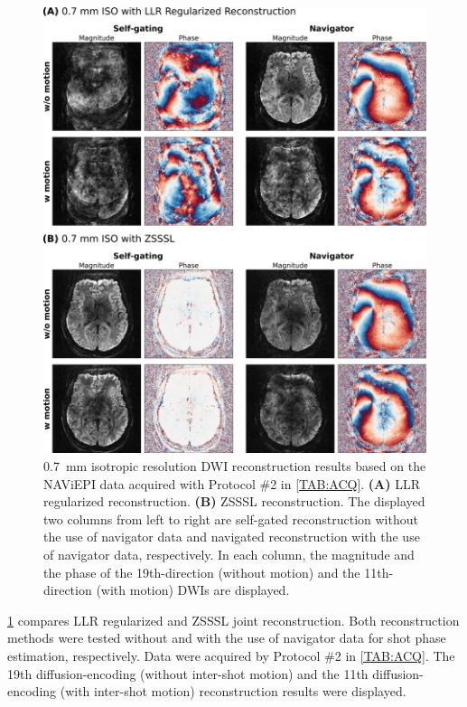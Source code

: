 \documentclass[journal,twoside,web]{ieeecolor}
\begin{document}
	\begin{figure}
		\centering
		\includegraphics[width=\textwidth]{../figures/fig3.png}
		\caption{\SI{0.7}{\milli\meter} isotropic resolution DWI reconstruction results
			based on the NAViEPI data acquired with Protocol \#2 in \cref{TAB:ACQ}.
			\textbf{(A)} LLR regularized reconstruction.
			\textbf{(B)} ZSSSL reconstruction.
			The displayed two columns from left to right are
			self-gated reconstruction without the use of navigator data and
			navigated reconstruction with the use of navigator data, respectively.
			In each column, the magnitude and the phase
			of the 19th-direction (without motion) and the 11th-direction (with motion)
			DWIs are displayed.
		}
		\label{FIG:MOTION_RETRO_AXIAL}
	\end{figure}

	\cref{FIG:MOTION_RETRO_AXIAL} compares LLR regularized
	and ZSSSL joint reconstruction.
	Both reconstruction methods were tested
	without and with the use of navigator data
	for shot phase estimation, respectively.
	Data were acquired by Protocol \#2 in \cref{TAB:ACQ}.
	The 19th diffusion-encoding (without inter-shot motion)
	and the 11th diffusion-encoding (with inter-shot motion)
	reconstruction results were displayed.
\end{document}
